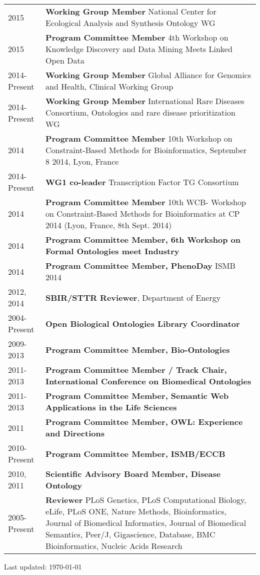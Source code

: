 \documentclass[11pt,fullpage]{article}
\begin{document}
\begin{longtable}{p{0.5in}|p{5.5in}}

2015  & \textbf{Working Group Member}  National Center for Ecological
Analysis and Synthesis Ontology WG \\
2015  & \textbf{Program Committee Member}  4th Workshop on Knowledge Discovery and Data Mining Meets Linked Open Data \\
2014-Present  & \textbf{Working Group Member}  Global Alliance for Genomics and Health, Clinical Working Group \\
2014-Present  & \textbf{Working Group Member}  International Rare Diseases Consortium, Ontologies and rare disease prioritization WG \\
2014  & \textbf{Program Committee Member}  10th Workshop on Constraint-Based Methods for Bioinformatics, September 8 2014, Lyon, France \\
2014-Present  & \textbf{WG1 co-leader} Transcription Factor TG Consortium \\
2014 & \textbf{Program Committee Member} 10th WCB- Workshop on Constraint-Based Methods for Bioinformatics at CP 2014 (Lyon, France, 8th Sept. 2014) \\
2014 & \textbf{Program Committee Member, 6th Workshop on Formal Ontologies meet Industry}\\
2014 & \textbf{Program Committee Member, PhenoDay} ISMB 2014\\
2012, 2014 & \textbf{SBIR/STTR Reviewer}, Department of Energy \\
2004-Present  & \textbf{Open Biological Ontologies Library Coordinator} \\
2009-2013  & \textbf{Program Committee Member, Bio-Ontologies} \\
2011-2013 & \textbf{Program Committee Member / Track Chair, International Conference on Biomedical Ontologies}\\
2011-2013 & \textbf{Program Committee Member, Semantic Web  Applications in the Life Sciences}\\
2011 & \textbf{Program Committee Member, OWL: Experience and Directions} \\
2010-Present & \textbf{Program Committee Member, ISMB/ECCB} \\
2010, 2011 & \textbf{Scientific Advisory Board Member, Disease Ontology} \\
2005-Present  & \textbf{Reviewer} PLoS Genetics, PLoS Computational
Biology, eLife, PLoS ONE, Nature Methods, Bioinformatics, Journal of
Biomedical Informatics, Journal of Biomedical Semantics, Peer/J, Gigascience, Database, BMC Bioinformatics, Nucleic Acids Research\\

\end{longtable}







\bigskip
\begin{center}
  \begin{footnotesize}
    Last updated: \today
  \end{footnotesize}
\end{center}



\end{document}
